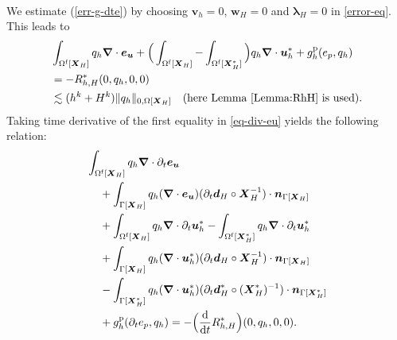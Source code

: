 \documentclass[11pt,reqno]{amsart}
\theoremstyle{definition}
\theoremstyle{plain}
\numberwithin{theorem}{section}
\numberwithin{proposition}{section}
\numberwithin{lemma}{section}
\numberwithin{equation}{section}
\newcommand{\bs}[1]{\boldsymbol{#1}}
\newcommand{\uu}[1]  {{\bs{#1}} }
\newcommand{\dep}{{{\bs{d}}}}
\newcommand{\grad}   { \uu{\nabla}    }
\def\d{\mathrm{d}}
\newcommand{\bu}{\uu{u}}
\renewcommand{\(}{\bigl(}
\renewcommand{\)}{\bigr)}
\begin{document}
\\
We estimate (\ref{err-g-dte}) by choosing ${\bs v}_h = 0$, ${\bs w}_H= 0$ and ${\bs\lambda}_H=0$ in \eqref{error-eq}. This leads to
\begin{align}\label{eq-div-eu}
&\int_{\Omega^{\rm f}[\bs X_H]}  q_h \grad\cdot {\bs e}_{\bs u}  
+ \Big( \int_{\Omega^{\rm f}[\bs X_H]} - \int_{\Omega^{\rm f}[\bs X_H^*]} \Big) q_h \grad\cdot  \bu_h^* 
+ g_h^{\rm p} (e_p, q_h) \notag\\
&= 
- R_{h,H}^*(0, q_h, 0, 0) \notag\\
&\lesssim (h^k+H^k) \|q_h\|_{0,\Omega[{\bs X}_H]} \quad\mbox{(here Lemma \ref{Lemma:RhH} is used)}. 
\end{align}
Taking time derivative of the first equality in \eqref{eq-div-eu} yields the following relation: 
\begin{subequations}\label{dteq-div-eu}
\begin{align}
&\int_{\Omega^{\rm f}[\bs X_H]} q_h \grad\cdot \partial_t{\bs e}_{\bs u}  \notag\\
&\quad\, 
+ \int_{\Gamma[\bs X_H]} q_h (\grad\cdot {\bs e}_{\bs u}) (\partial_t\dep_H\circ \bs X_H^{-1})\cdot{\bs n}_{\Gamma[\bs X_H]} \label{dteq-div-eu-a}\\
&\quad\, 
+ \int_{\Omega^{\rm f}[\bs X_H]} q_h \grad\cdot \partial_t\bu_h^* 
- \int_{\Omega^{\rm f}[\bs X_H^*]} q_h \grad\cdot \partial_t\bu_h^* \label{dteq-div-eu-b}\\
&\quad\, 
+ \int_{\Gamma[\bs X_H]} q_h (\grad\cdot \bu_h^*) (\partial_t\dep_H\circ \bs X_H^{-1})\cdot{\bs n}_{\Gamma[\bs X_H]} \notag\\
&\quad\, 
- \int_{\Gamma[\bs X_H^*]} q_h (\grad\cdot \bu_h^*) (\partial_t\dep_H^*\circ ({\bs X}_H^*)^{-1})\cdot{\bs n}_{\Gamma[\bs X_H^*]} \label{dteq-div-eu-c}\\
&\quad\, 
+ g_h^{\rm p} (\partial_t e_p, q_h) = - \Big(\frac{\d}{\d t} R_{h,H}^*\Big) (0, q_h, 0, 0) . 
\end{align}
\end{subequations}
\end{document}
